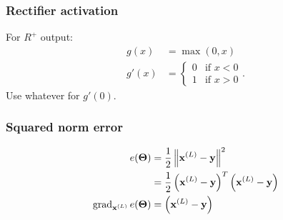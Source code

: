 \subsubsection{Rectifier activation}
For $R^+$ output:
\begin{align}
    g(x)    &= \max(0, x) \\
    g'(x)   &=
        \begin{cases}
            0 & \text{if } x < 0 \\
            1 & \text{if } x > 0
        \end{cases}.
\end{align}
Use whatever for $g'(0)$.

\subsubsection{Squared norm error}
\begin{align}
    e(\boldsymbol{\mathbf{\Theta}})  &= \frac{1}{2}\left\|\boldsymbol{\mathbf{x}}^{(L)} - \boldsymbol{\mathbf{y}} \right\|^2 \\
                    &= \frac{1}{2}\left(\boldsymbol{\mathbf{x}}^{(L)} - \boldsymbol{\mathbf{y}}\right)^T \left(\boldsymbol{\mathbf{x}}^{(L)} - \boldsymbol{\mathbf{y}}\right) \\
    \operatorname{\mathrm{grad}}_{\boldsymbol{\mathbf{x}}^{(L)}} e(\boldsymbol{\mathbf{\Theta}}) &= \left(\boldsymbol{\mathbf{x}}^{(L)} - \boldsymbol{\mathbf{y}}\right)
\end{align}

